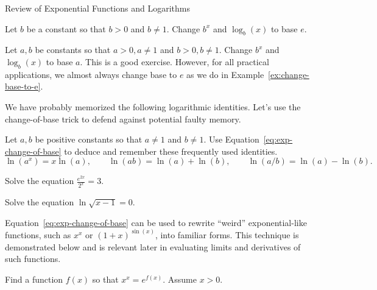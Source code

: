 \documentclass[../main.tex]{subfiles}
\begin{document}
\begin{lesson}{Review of Exponential Functions and Logarithms}
  \begin{example} \label{ex:change-base-to-e}
    Let \(b\) be a constant so that \(b > 0\) and \(b \ne 1\).  Change \(b^{x}\) and \(\log_{b}(x)\) to base \(e\). 

  \end{example}
  \clearpage


  \begin{example}
    Let \(a,b\) be constants so that \(a > 0, a \ne 1\) and \(b > 0, b \ne 1\).  
    Change \(b^{x}\) and \(\log_{b}(x)\) to base \(a\). \newline
    \faExclamationTriangle{} This is a good exercise. However, for all practical applications, we almost always change base to \(e\) as we do in Example~\ref{ex:change-base-to-e}.

  \end{example}


  We have probably memorized the following logarithmic identities. Let's use the change-of-base trick to defend against potential faulty memory.

  \begin{example}
    Let \(a,b\) be positive constants so that \(a \ne 1\) and \(b \ne 1\). Use Equation~\eqref{eq:exp-change-of-base} to deduce and remember these frequently used identities.
    \[
      \ln(a^{x}) = x \ln(a),
      \qquad
      \ln(ab) = \ln(a) + \ln(b),
      \qquad
      \ln(a/b) = \ln(a) - \ln(b).
    \]
  \end{example}
  \clearpage

  \begin{example}
    Solve the equation \(\frac{e^{2x}}{2^{x}} = 3\).

  \end{example}

  \begin{example}
    Solve the equation \(\ln \sqrt{x - 1} = 0\). 
  \end{example}

  \faStar{} Equation~\eqref{eq:exp-change-of-base} can be used to rewrite ``weird'' exponential-like functions, such as \(x^{x}\) or \((1+x)^{\sin(x)}\), into familiar forms. This technique is demonstrated below and is relevant later in evaluating limits and derivatives of such functions.

  \begin{example} \label{ex:x-to-x}
    Find a function \(f(x)\) so that \(x^{x} = e^{f(x)}\). Assume \(x > 0\). \newline


\end{example}
\end{lesson}
\end{document}
